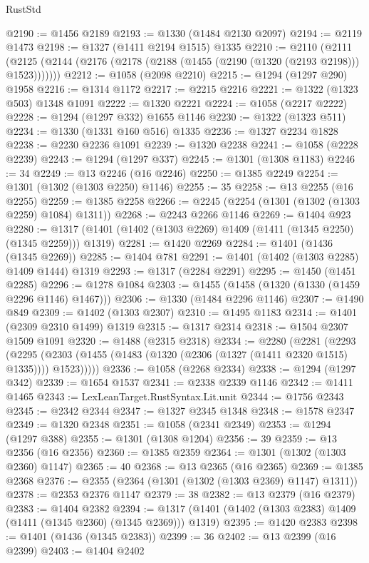 \begin{lexlean}{RustStd}
\begin{coremodule}
@2190 := @1456 @2189
@2193 := @1330 (@1484 @2130 @2097)
@2194 := @2119 @1473
@2198 := @1327 (@1411 @2194 @1515) @1335
@2210 := @2110
    (@2111 (@2125 (@2144 (@2176 (@2178 (@2188 (@1455 (@2190 (@1320 (@2193 @2198))) @1523)))))))
@2212 := @1058 (@2098 @2210)
@2215 := @1294 (@1297 @290) @1958
@2216 := @1314 @1172
@2217 := @2215 @2216
@2221 := @1322 (@1323 @503) @1348 @1091
@2222 := @1320 @2221
@2224 := @1058 (@2217 @2222)
@2228 := @1294 (@1297 @332) @1655 @1146
@2230 := @1322 (@1323 @511)
@2234 := @1330 (@1331 @160 @516) @1335
@2236 := @1327 @2234 @1828
@2238 := @2230 @2236 @1091
@2239 := @1320 @2238
@2241 := @1058 (@2228 @2239)
@2243 := @1294 (@1297 @337)
@2245 := @1301 (@1308 @1183)
@2246 := 34
@2249 := @13 @2246 (@16 @2246)
@2250 := @1385 @2249
@2254 := @1301 (@1302 (@1303 @2250) @1146)
@2255 := 35
@2258 := @13 @2255 (@16 @2255)
@2259 := @1385 @2258
@2266 := @2245 (@2254 (@1301 (@1302 (@1303 @2259) @1084) @1311))
@2268 := @2243 @2266 @1146
@2269 := @1404 @923
@2280 := @1317 (@1401 (@1402 (@1303 @2269) @1409 (@1411 (@1345 @2250) (@1345 @2259))) @1319)
@2281 := @1420 @2269
@2284 := @1401 (@1436 (@1345 @2269))
@2285 := @1404 @781
@2291 := @1401 (@1402 (@1303 @2285) @1409 @1444) @1319
@2293 := @1317 (@2284 @2291)
@2295 := @1450 (@1451 @2285)
@2296 := @1278 @1084
@2303 := @1455 (@1458 (@1320 (@1330 (@1459 @2296 @1146) @1467)))
@2306 := @1330 (@1484 @2296 @1146)
@2307 := @1490 @849
@2309 := @1402 (@1303 @2307)
@2310 := @1495 @1183
@2314 := @1401 (@2309 @2310 @1499) @1319
@2315 := @1317 @2314
@2318 := @1504 @2307 @1509 @1091
@2320 := @1488 (@2315 @2318)
@2334 := @2280
    (@2281
      (@2293
        (@2295 (@2303 (@1455 (@1483 (@1320 (@2306 (@1327 (@1411 @2320 @1515) @1335)))) @1523)))))
@2336 := @1058 (@2268 @2334)
@2338 := @1294 (@1297 @342)
@2339 := @1654 @1537
@2341 := @2338 @2339 @1146
@2342 := @1411 @1465
@2343 := LexLeanTarget.RustSyntax.Lit.unit
@2344 := @1756 @2343
@2345 := @2342 @2344
@2347 := @1327 @2345 @1348
@2348 := @1578 @2347
@2349 := @1320 @2348
@2351 := @1058 (@2341 @2349)
@2353 := @1294 (@1297 @388)
@2355 := @1301 (@1308 @1204)
@2356 := 39
@2359 := @13 @2356 (@16 @2356)
@2360 := @1385 @2359
@2364 := @1301 (@1302 (@1303 @2360) @1147)
@2365 := 40
@2368 := @13 @2365 (@16 @2365)
@2369 := @1385 @2368
@2376 := @2355 (@2364 (@1301 (@1302 (@1303 @2369) @1147) @1311))
@2378 := @2353 @2376 @1147
@2379 := 38
@2382 := @13 @2379 (@16 @2379)
@2383 := @1404 @2382
@2394 := @1317 (@1401 (@1402 (@1303 @2383) @1409 (@1411 (@1345 @2360) (@1345 @2369))) @1319)
@2395 := @1420 @2383
@2398 := @1401 (@1436 (@1345 @2383))
@2399 := 36
@2402 := @13 @2399 (@16 @2399)
@2403 := @1404 @2402

\end{coremodule}
\end{lexlean}
